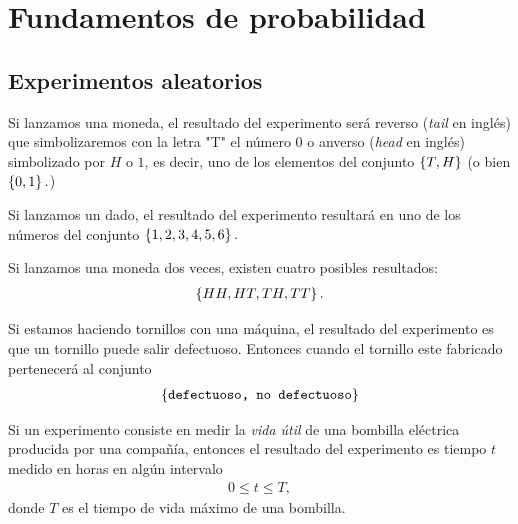 
\section{Fundamentos de probabilidad}

\subsection{Experimentos aleatorios}

\begin{ejemplo}
	\label{exmp:2.2.1}
	Si lanzamos una moneda, el resultado del experimento será reverso (\emph{tail} en inglés) que simbolizaremos con la letra "T" el número $0$ o anverso (\emph{head} en inglés) simbolizado por $H$ o $1$, es decir, uno de los elementos del conjunto $\left\{ T,H \right\}$ (o bien $\left\{ 0,1 \right\}.$)
\end{ejemplo}



\begin{ejemplo}
	\label{exmp:2.2.2}
	Si lanzamos un dado, el resultado del experimento resultará en uno de los números del conjunto $\left\{ 1,2,3,4,5,6 \right\}.$
\end{ejemplo}



\begin{ejemplo}
	\label{exmp:2.2.3}
	Si lanzamos una moneda dos veces, existen cuatro posibles resultados:
	\begin{align}
		\left\{ HH,HT,TH,TT \right\}.
	\end{align}
	
\end{ejemplo}



\begin{ejemplo}
	\label{exmp:2.2.4}
	Si estamos haciendo tornillos con una máquina, el resultado del experimento es que un tornillo puede salir defectuoso. Entonces cuando el tornillo este fabricado pertenecerá al conjunto
	\begin{align}
		\left\{ \texttt{defectuoso, no defectuoso} \right\}
	\end{align}
	
\end{ejemplo}



\begin{ejemplo}
	\label{exmp:2.2.5}
	Si un experimento consiste en medir la \emph{vida útil} de una bombilla eléctrica producida por una compañía, entonces el resultado del experimento es tiempo $t$ medido en horas en algún intervalo
	\begin{align}
		0\leq t \leq T,
	\end{align}
	donde $T$ es el tiempo de vida máximo de una bombilla.
\end{ejemplo}



